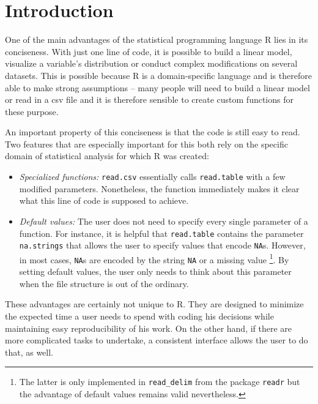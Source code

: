 \documentclass[]{report}
\let\rmarkdownfootnote\footnote%
\def\footnote{\protect\rmarkdownfootnote}
\theoremstyle{definition}
\theoremstyle{definition}
\theoremstyle{definition}
\theoremstyle{remark}
\begin{document}
\tableofcontents

\chapter{Introduction}\label{intro}

 \setcounter{page}{1}

One of the main advantages of the statistical programming language R
\citep{R} lies in its conciseness. With just one line of code, it is
possible to build a linear model, visualize a variable's distribution or
conduct complex modifications on several datasets. This is possible
because R is a domain-specific language and is therefore able to make
strong assumptions -- many people will need to build a linear model or
read in a csv file and it is therefore sensible to create custom
functions for these purpose.

An important property of this conciseness is that the code is still easy
to read. Two features that are especially important for this both rely
on the specific domain of statistical analysis for which R was created:

\begin{itemize}
\item
  \emph{Specialized functions:} \texttt{read.csv} essentially calls
  \texttt{read.table} with a few modified parameters. Nonetheless, the
  function immediately makes it clear what this line of code is supposed
  to achieve.
\item
  \emph{Default values:} The user does not need to specify every single
  parameter of a function. For instance, it is helpful that
  \texttt{read.table} contains the parameter \texttt{na.strings} that
  allows the user to specify values that encode \texttt{NA}s. However,
  in most cases, \texttt{NA}s are encoded by the string \texttt{NA} or a
  missing value \footnote{The latter is only implemented in
    \texttt{read\_delim} from the package \texttt{readr} but the
    advantage of default values remains valid nevertheless.}. By setting
  default values, the user only needs to think about this parameter when
  the file structure is out of the ordinary.
\end{itemize}

These advantages are certainly not unique to R. They are designed to
minimize the expected time a user needs to spend with coding his
decisions while maintaining easy reproducibility of his work. On the
other hand, if there are more complicated tasks to undertake, a
consistent interface allows the user to do that, as well.
\end{document}

